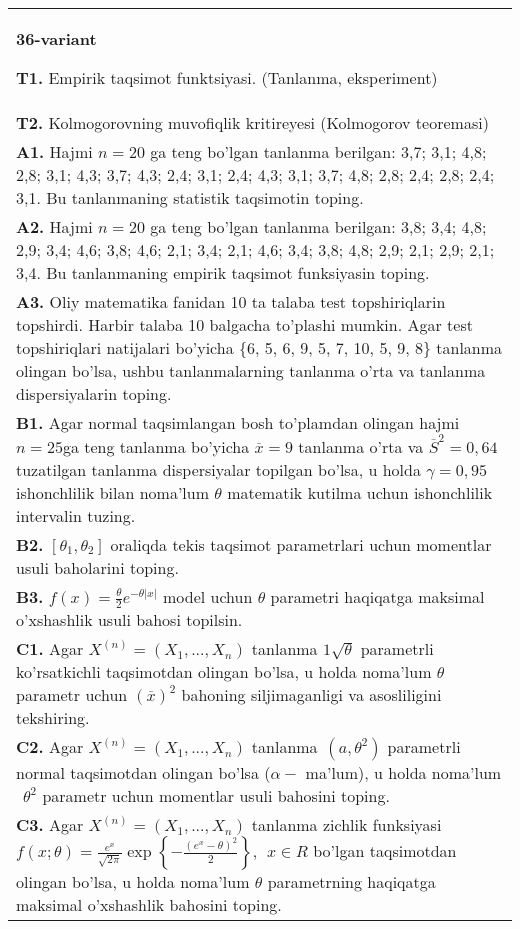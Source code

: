 \documentclass{article}
\begin{document}
\vspace{1cm}


\begin{tabular}{m{17cm}}
\textbf{36-variant}
\newline

\textbf{T1.} 
Empirik taqsimot funktsiyasi. (Tanlanma, eksperiment)
\\
\textbf{T2.} 
Kolmogorovning muvofiqlik kritireyesi (Kolmogorov teoremasi)
\\
\textbf{A1.} 
Hajmi \(n = 20\) ga teng bo'lgan tanlanma berilgan: 3,7; 3,1; 4,8; 2,8; 3,1; 4,3; 3,7; 4,3; 2,4; 3,1; 2,4; 4,3; 3,1; 3,7; 4,8; 2,8; 2,4; 2,8; 2,4; 3,1. Bu tanlanmaning statistik taqsimotin toping.
\\
\textbf{A2.} 
Hajmi \(n = 20\) ga teng bo'lgan tanlanma berilgan: 3,8; 3,4; 4,8; 2,9; 3,4; 4,6; 3,8; 4,6; 2,1; 3,4; 2,1; 4,6; 3,4; 3,8; 4,8; 2,9; 2,1; 2,9; 2,1; 3,4. Bu tanlanmaning empirik taqsimot funksiyasin toping.
\\
\textbf{A3.} 
Oliy matematika fanidan 10 ta talaba test topshiriqlarin topshirdi. Harbir talaba 10 balgacha to'plashi mumkin. Agar test topshiriqlari natijalari bo'yicha \{6, 5, 6, 9, 5, 7, 10, 5, 9, 8\} tanlanma olingan bo'lsa, ushbu tanlanmalarning tanlanma o'rta va tanlanma dispersiyalarin toping.
\\
\textbf{B1.} 
Agar normal taqsimlangan bosh to'plamdan olingan hajmi \(n = 25\)ga teng tanlanma bo'yicha \(\overline{x} = 9\) tanlanma o'rta va \({\overline{S}}^{2} = 0,64\) tuzatilgan tanlanma dispersiyalar topilgan bo'lsa, u holda \(\gamma = 0,95\) ishonchlilik bilan noma'lum \(\theta\) matematik kutilma uchun ishonchlilik intervalin tuzing.
\\
\textbf{B2.} 
\(\left\lbrack \theta_{1},\theta_{2} \right\rbrack\) oraliqda tekis taqsimot parametrlari uchun momentlar usuli baholarini toping.
\\
\textbf{B3.} 
\(f(x) = \frac{\theta}{2}e^{- \theta|x|}\) model uchun \(\theta\) parametri haqiqatga maksimal o'xshashlik usuli bahosi topilsin.
\\
\textbf{C1.} 
Agar \(X^{(n)} = \left( X_{1},...,X_{n} \right)\) tanlanma \(1\sqrt{\theta}\) parametrli ko'rsatkichli taqsimotdan olingan bo'lsa, u holda noma'lum \(\theta\) parametr uchun \((\overline{x})^{2}\) bahoning siljimaganligi va asosliligini tekshiring.
\\
\textbf{C2.} 
Agar \(X^{(n)} = \left( X_{1},...,X_{n} \right)\) tanlanma\(\ \ (a,\theta^{2})\) parametrli normal taqsimotdan olingan bo'lsa (\(\alpha -\) ma'lum), u holda noma'lum\(\ \ \theta^{2}\) parametr uchun momentlar usuli bahosini toping.
\\
\textbf{C3.} 
Agar \(X^{(n)} = \left( X_{1},...,X_{n} \right)\) tanlanma zichlik funksiyasi \(f(x;\theta) = \frac{e^{x}}{\sqrt{2\pi}}\exp\left\{ - \frac{\left( e^{x} - \theta \right)^{2}}{2} \right\},\ \ x \in R\) bo'lgan taqsimotdan olingan bo'lsa, u holda noma'lum \(\theta\) parametrning haqiqatga maksimal o'xshashlik bahosini toping.
\\

\end{tabular}
\vspace{1cm}
\end{document}
